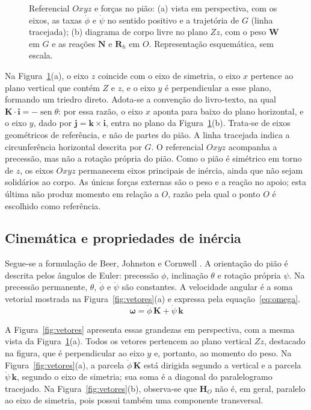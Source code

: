 \documentclass[12pt,a4paper]{article}
\newcommand{\vet}[1]{\mathbf{#1}}
\newcommand{\vomega}{\boldsymbol{\omega}}
\newcommand{\seno}{\operatorname{sen}}
\newcommand{\phid}{\dot{\phi}}
\newcommand{\psid}{\dot{\psi}}
\begin{document}
\begin{figure}[H]
\centering

\caption[Referencial $Oxyz$ e diagrama de corpo livre do pião]{Referencial $Oxyz$ e forças no pião: (a) vista em perspectiva, com os eixos, as taxas $\dot{\phi}$ e $\dot{\psi}$ no sentido positivo e a trajetória de $G$ (linha tracejada); (b) diagrama de corpo livre no plano $Zz$, com o peso $\vet{W}$ em $G$ e as reações $\vet{N}$ e $\vet{R}_h$ em $O$. Representação esquemática, sem escala.}
\label{fig:dcl}
\end{figure}

Na Figura~\ref{fig:dcl}(a), o eixo $z$ coincide com o eixo de simetria, o eixo $x$ pertence ao plano vertical que contém $Z$ e $z$, e o eixo $y$ é perpendicular a esse plano, formando um triedro direto. Adota-se a convenção do livro-texto, na qual $\vet{K}\cdot\vet{i}=-\seno\theta$: por essa razão, o eixo $x$ aponta para baixo do plano horizontal, e o eixo $y$, dado por $\vet{j}=\vet{k}\times\vet{i}$, entra no plano da Figura~\ref{fig:dcl}(b). Trata-se de eixos geométricos de referência, e não de partes do pião. A linha tracejada indica a circunferência horizontal descrita por $G$. O referencial $Oxyz$ acompanha a precessão, mas não a rotação própria do pião. Como o pião é simétrico em torno de $z$, os eixos $Oxyz$ permanecem eixos principais de inércia, ainda que não sejam solidários ao corpo. As únicas forças externas são o peso e a reação no apoio; esta última não produz momento em relação a $O$, razão pela qual o ponto $O$ é escolhido como referência.

\subsection{Cinemática e propriedades de inércia}

Segue-se a formulação de Beer, Johnston e Cornwell \cite{beer}. A orientação do pião é descrita pelos ângulos de Euler: precessão $\phi$, inclinação $\theta$ e rotação própria $\psi$. Na precessão permanente, $\theta$, $\phid$ e $\psid$ são constantes. A velocidade angular é a soma vetorial mostrada na Figura~\ref{fig:vetores}(a) e expressa pela equação~\ref{eq:omega}.
\begin{equation}
\vomega = \phid\,\vet{K} + \psid\,\vet{k}
\label{eq:omega}
\end{equation}

A Figura~\ref{fig:vetores} apresenta essas grandezas em perspectiva, com a mesma vista da Figura~\ref{fig:dcl}(a). Todos os vetores pertencem ao plano vertical $Zz$, destacado na figura, que é perpendicular ao eixo $y$ e, portanto, ao momento do peso. Na Figura~\ref{fig:vetores}(a), a parcela $\phid\,\vet{K}$ está dirigida segundo a vertical e a parcela $\psid\,\vet{k}$, segundo o eixo de simetria; sua soma é a diagonal do paralelogramo tracejado. Na Figura~\ref{fig:vetores}(b), observa-se que $\vet{H}_O$ não é, em geral, paralelo ao eixo de simetria, pois possui também uma componente transversal.
\end{document}
